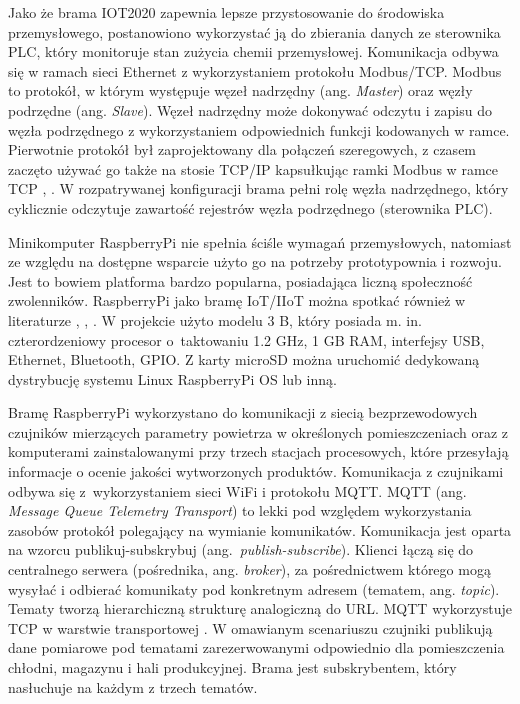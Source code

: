 \documentclass[a4paper, 12pt, twoside]{article}
\begin{document}
Jako że brama IOT2020 zapewnia lepsze przystosowanie do środowiska przemysłowego,
postanowiono wykorzystać ją do zbierania danych ze sterownika PLC, który
monitoruje stan zużycia chemii przemysłowej. Komunikacja odbywa się w ramach
sieci Ethernet z wykorzystaniem protokołu Modbus/TCP. Modbus to protokół,
w którym występuje węzeł nadrzędny (ang. \emph{Master}) oraz węzły
podrzędne (ang. \emph{Slave}). Węzeł nadrzędny może dokonywać odczytu i zapisu
do węzła podrzędnego z wykorzystaniem odpowiednich funkcji kodowanych w ramce.
Pierwotnie protokół był zaprojektowany dla połączeń szeregowych, z czasem
zaczęto używać go także na stosie TCP/IP kapsułkując ramki Modbus w ramce TCP
\cite{isp}, \cite{isp-analiza-przepływu-informacji}. W rozpatrywanej konfiguracji
brama pełni rolę węzła nadrzędnego, który cyklicznie odczytuje zawartość
rejestrów węzła podrzędnego (sterownika PLC).

Minikomputer RaspberryPi nie spełnia ściśle wymagań przemysłowych, natomiast ze
względu na dostępne wsparcie użyto go na potrzeby prototypownia i rozwoju.
Jest to bowiem platforma bardzo popularna, posiadająca liczną społeczność zwolenników.
RaspberryPi jako bramę IoT/IIoT można spotkać również w literaturze \cite{iiot-opensource-gateway},
\cite{design-impl-node-gateway}, \cite{low-cost-esp32-pi-node-red-scada}.
W projekcie użyto modelu 3 B, który posiada m. in. czterordzeniowy
procesor o~taktowaniu 1.2 GHz, 1 GB RAM, interfejsy USB, Ethernet, Bluetooth, GPIO.
Z karty microSD można uruchomić dedykowaną dystrybucję systemu Linux RaspberryPi OS lub inną.

Bramę RaspberryPi wykorzystano do komunikacji z siecią bezprzewodowych czujników
mierzących parametry powietrza w określonych pomieszczeniach oraz z
komputerami zainstalowanymi przy trzech stacjach procesowych, które
przesyłają informacje o ocenie jakości wytworzonych produktów.
Komunikacja z czujnikami odbywa się z~wykorzystaniem sieci WiFi i protokołu
MQTT. MQTT (ang. \emph{Message Queue Telemetry Transport}) to lekki pod względem wykorzystania zasobów
protokół polegający na wymianie komunikatów. Komunikacja
jest oparta na wzorcu publikuj-subskrybuj (ang.~\emph{publish-subscribe}).
Klienci łączą się do centralnego serwera (pośrednika, ang. \emph{broker}), za pośrednictwem
którego mogą wysyłać i odbierać komunikaty pod konkretnym adresem (tematem, ang. \emph{topic}).
Tematy tworzą hierarchiczną strukturę analogiczną do URL. MQTT
wykorzystuje TCP w warstwie transportowej \cite{iot-hype-to-reality}. W omawianym
scenariuszu czujniki publikują dane pomiarowe pod tematami zarezerwowanymi
odpowiednio dla pomieszczenia chłodni, magazynu i hali produkcyjnej. Brama
jest subskrybentem, który nasłuchuje na każdym z trzech tematów.
\end{document}
